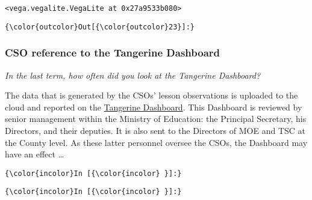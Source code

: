 \documentclass[11pt]{article}
\begin{document}
    
    \begin{verbatim}
<vega.vegalite.VegaLite at 0x27a9533b080>
    \end{verbatim}

    
\begin{Verbatim}[commandchars=\\\{\}]
{\color{outcolor}Out[{\color{outcolor}23}]:} 
\end{Verbatim}
            
    \hypertarget{cso-reference-to-the-tangerine-dashboard}{%
\subsubsection{CSO reference to the Tangerine
Dashboard}\label{cso-reference-to-the-tangerine-dashboard}}

\emph{In the last term, how often did you look at the Tangerine
Dashboard?}

The data that is generated by the CSOs' lesson observations is uploaded
to the cloud and reported on the
\href{http://tools.tusome.tangerinecentral.org/_csv/report/group-national_tablet_program/00b0a09a-2a9f-baca-2acb-c6264d4247cb,c835fc38-de99-d064-59d3-e772ccefcf7d/2018/1/ep8yqMKT.html\#tutor}{Tangerine
Dashboard}. This Dashboard is reviewed by senior management within the
Ministry of Education: the Principal Secretary, his Directors, and their
deputies. It is also sent to the Directors of MOE and TSC at the County
level. As these latter personnel oversee the CSOs, the Dashboard may
have an effect \ldots{}

    \begin{Verbatim}[commandchars=\\\{\}]
{\color{incolor}In [{\color{incolor} }]:} 
\end{Verbatim}

    \begin{Verbatim}[commandchars=\\\{\}]
{\color{incolor}In [{\color{incolor} }]:} 
\end{Verbatim}


    
    
    
    
\end{document}
